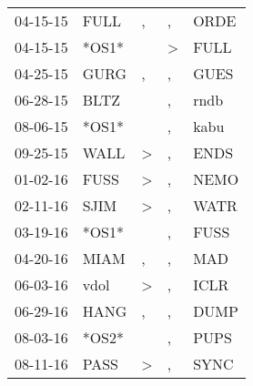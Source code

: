 \begin{supertabular}{p{0.07\textwidth}p{0.06\textwidth}p{0.02\textwidth}p{0.02\textwidth}p{0.06\textwidth}}
          04-15-15\textsuperscript{} &           FULL\textsuperscript{} &                , &                , &           ORDE\textsuperscript{} \\
          04-15-15\textsuperscript{} &                            *OS1* &                  &     \textgreater &           FULL\textsuperscript{} \\
          04-25-15\textsuperscript{} &           GURG\textsuperscript{} &                , &                , &           GUES\textsuperscript{} \\
          06-28-15\textsuperscript{} &           BLTZ\textsuperscript{} &                  &                , &           rndb\textsuperscript{} \\
          08-06-15\textsuperscript{} &                            *OS1* &                  &                , &           kabu\textsuperscript{} \\
          09-25-15\textsuperscript{} &           WALL\textsuperscript{} &     \textgreater &                , &           ENDS\textsuperscript{} \\
          01-02-16\textsuperscript{} &           FUSS\textsuperscript{} &     \textgreater &                , &           NEMO\textsuperscript{} \\
          02-11-16\textsuperscript{} &           SJIM\textsuperscript{} &     \textgreater &                , &           WATR\textsuperscript{} \\
          03-19-16\textsuperscript{} &                            *OS1* &                  &                , &           FUSS\textsuperscript{} \\
          04-20-16\textsuperscript{} &           MIAM\textsuperscript{} &                , &                , &            MAD\textsuperscript{} \\
          06-03-16\textsuperscript{} &           vdol\textsuperscript{} &     \textgreater &                , &           ICLR\textsuperscript{} \\
          06-29-16\textsuperscript{} &           HANG\textsuperscript{} &                , &                , &           DUMP\textsuperscript{} \\
          08-03-16\textsuperscript{} &                            *OS2* &                  &                , &           PUPS\textsuperscript{} \\
          08-11-16\textsuperscript{} &           PASS\textsuperscript{} &     \textgreater &                , &           SYNC\textsuperscript{} \\

\end{supertabular}
